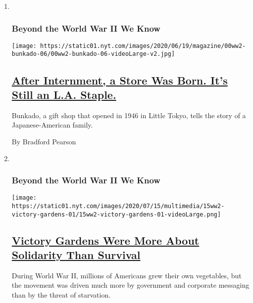 \begin{enumerate}
\def\labelenumi{\arabic{enumi}.}
\item ~
  \hypertarget{beyond-the-world-war-ii-we-know-3}{%
  \subsubsection{Beyond the World War II We
  Know}\label{beyond-the-world-war-ii-we-know-3}}

  \texttt{[image: https://static01.nyt.com/images/2020/06/19/magazine/00ww2-bunkado-06/00ww2-bunkado-06-videoLarge-v2.jpg]}

  \hypertarget{after-internment-a-store-was-born-its-still-an-la-staple}{%
  \subsection{\texorpdfstring{\href{/2020/07/01/magazine/little-tokyo-bunkado-los-angeles-japanese.html}{After
  Internment, a Store Was Born. It's Still an L.A.
  Staple.}}{After Internment, a Store Was Born. It's Still an L.A. Staple.}}\label{after-internment-a-store-was-born-its-still-an-la-staple}}

  Bunkado, a gift shop that opened in 1946 in Little Tokyo, tells the
  story of a Japanese-American family.

  By Bradford Pearson
\item ~
  \hypertarget{beyond-the-world-war-ii-we-know-4}{%
  \subsubsection{Beyond the World War II We
  Know}\label{beyond-the-world-war-ii-we-know-4}}

  \texttt{[image: https://static01.nyt.com/images/2020/07/15/multimedia/15ww2-victory-gardens-01/15ww2-victory-gardens-01-videoLarge.png]}

  \hypertarget{victory-gardens-were-more-about-solidarity-than-survival}{%
  \subsection{\texorpdfstring{\href{/2020/07/15/magazine/victory-gardens-world-war-II.html}{Victory
  Gardens Were More About Solidarity Than
  Survival}}{Victory Gardens Were More About Solidarity Than Survival}}\label{victory-gardens-were-more-about-solidarity-than-survival}}

  During World War II, millions of Americans grew their own vegetables,
  but the movement was driven much more by government and corporate
  messaging than by the threat of starvation.


\end{enumerate}
